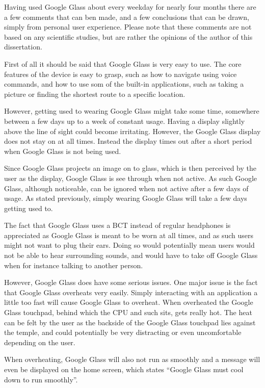 Having used Google Glass about every weekday for nearly four months there are a few comments that can ben made, and a few conclusions that can be drawn, simply from personal user experience. Please note that these comments are not based on any scientific studies, but are rather the opinions of the author of this dissertation.

First of all it should be said that Google Glass is very easy to use. The core features of the device is easy to grasp, such as how to navigate using voice commands, and how to use som of the built-in applications, such as taking a picture or finding the shortest route to a specific location.

However, getting used to wearing Google Glass might take some time, somewhere between a few days up to a week of constant usage. Having a display slightly above the line of sight could become irritating. However, the Google Glass display does not stay on at all times. Instead the display times out after a short period when Google Glass is not being used.

Since Google Glass projects an image on to glass, which is then perceived by the user as the display, Google Glass is see through when not active. As such Google Glass, although noticeable, can be ignored when not active after a few days of usage. As stated previously, simply wearing Google Glass will take a few days getting used to.

The fact that Google Glass uses a BCT instead of regular headphones is appreciated as Google Glass is meant to be worn at all times, and as such users might not want to plug their ears. Doing so would potentially mean users would not be able to hear surrounding sounds, and would have to take off Google Glass when for instance talking to another person.

However, Google Glass does have some serious issues. One major issue is the fact that Google Glass overheats very easily. Simply interacting with an application a little too fast will cause Google Glass to overheat. When overheated the Google Glass touchpad, behind which the CPU and such sits, gets really hot. The heat can be felt by the user as the backside of the Google Glass touchpad lies against the temple, and could potentially be very distracting or even uncomfortable depending on the user.

When overheating, Google Glass will also not run as smoothly and a message will even be displayed on the home screen, which states ``Google Glass must cool down to run smoothly''.

